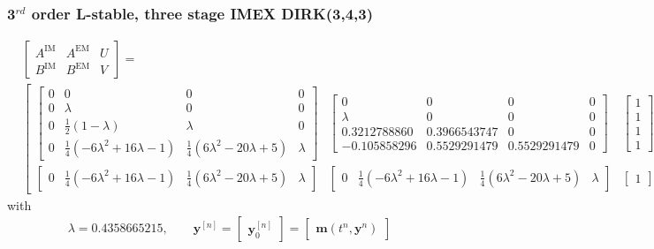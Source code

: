 \subsubsection{3$^{rd}$ order L-stable, three stage IMEX DIRK(3,4,3)}
\tiny
\begin{align*}
  &\left[\begin{array}{cc|c}
  A^{\mathrm{IM}} & A^{\mathrm{EM}} & U \\
  \hline
  B^{\mathrm{IM}} & B^{\mathrm{EM}} & V
  \end{array}\right] =\\
  &\left[\begin{array}{cc|c}
  \left[\begin{array}{cccc}
  0 & 0 & 0 & 0 \\
  0 & \lambda & 0 & 0 \\
  0 & \frac{1}{2}\left(1-\lambda\right) & \lambda & 0 \\
  0 & \frac{1}{4}\left(-6\lambda^2+16\lambda-1\right) & \frac{1}{4}\left(6\lambda^2-20\lambda+5\right) & \lambda
  \end{array}\right] &
  \left[\begin{array}{cccc}
  0 & 0 & 0 & 0 \\
  \lambda & 0 & 0 & 0 \\
  0.3212788860 & 0.3966543747 & 0 & 0 \\
  -0.105858296 & 0.5529291479 & 0.5529291479 & 0
  \end{array}\right] &
  \left[\begin{array}{c}
  1\\
  1\\
  1\\
  1
  \end{array}\right] \\
  \hline
  \left[\begin{array}{cccc}
  0 & \frac{1}{4}\left(-6\lambda^2+16\lambda-1\right) & \frac{1}{4}\left(6\lambda^2-20\lambda+5\right) & \lambda
  \end{array}\right] &
  \left[\begin{array}{cccc}
  0 & \frac{1}{4}\left(-6\lambda^2+16\lambda-1\right) & \frac{1}{4}\left(6\lambda^2-20\lambda+5\right) & \lambda
  \end{array}\right] &
  \left[\begin{array}{c}
  1
  \end{array}\right]
  \end{array}\right]
\end{align*}
\normalsize
with
\begin{align*}
  \lambda=0.4358665215,\qquad
  \boldsymbol{y}^{[n]}=
  \left[\begin{array}{c}
  \boldsymbol{y}^{[n]}_0
  \end{array}\right]=
  \left[\begin{array}{c}
  \boldsymbol{m}\left(t^n,\boldsymbol{y}^{n}\right)
  \end{array}\right]
\end{align*}

